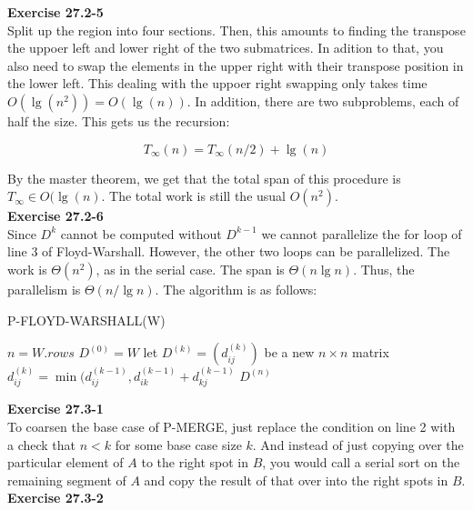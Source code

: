 \documentclass{article}
\begin{document}
\noindent\textbf{Exercise 27.2-5}\\

Split up the region into four sections. Then, this amounts to finding the transpose the uppoer left and lower right of the two submatrices. In adition to that, you also need to swap the elements in the upper right with their transpose position in the lower left. This dealing with the uppoer right swapping only takes time $O(\lg(n^2)) = O(\lg(n))$. In addition, there are two subproblems, each of half the size. This gets us the recursion:

\[
T_{\infty}(n) = T_{\infty}(n/2) + \lg(n)
\]

By the master theorem, we get that the total span of this procedure is $T_{\infty} \in O(\lg(n)$. The total work is still the usual $O(n^2)$.\\

\noindent\textbf{Exercise 27.2-6}\\

Since $D^k$ cannot be computed without $D^{k-1}$ we cannot parallelize the for loop of line 3 of Floyd-Warshall.  However, the other two loops can be parallelized.  The work is $\Theta(n^2)$, as in the serial case.  The span is $\Theta(n \lg n)$.  Thus, the parallelism is $\Theta(n/\lg n)$.  The algorithm is as follows:\\

\begin{algorithm}
\caption{P-FLOYD-WARSHALL(W)}
\begin{algorithmic}[1]
\State $n = W.rows$
\State $D^{(0)} = W$
	\State let $D^{(k)} = (d_{ij}^{(k)})$ be a new $n \times n$ matrix
			\State $d_{ij}^{(k)} = \min (d_{ij}^{(k-1)},d_{ik}^{(k-1)} + d_{kj}^{(k-1)} $
		\EndParFor
	\EndParFor
\EndFor
\State \Return $D^{(n)}$
\end{algorithmic}
\end{algorithm}


\noindent\textbf{Exercise 27.3-1}\\

To coarsen the base case of P-MERGE, just replace the condition on line 2 with a check that $n<k$ for some base case size $k$. And instead of just copying over the particular element of $A$ to the right spot in $B$,  you would call a serial sort on the remaining segment of $A$ and copy the result of that over into the right spots in $B$.\\

\noindent\textbf{Exercise 27.3-2}\\
\end{document}
